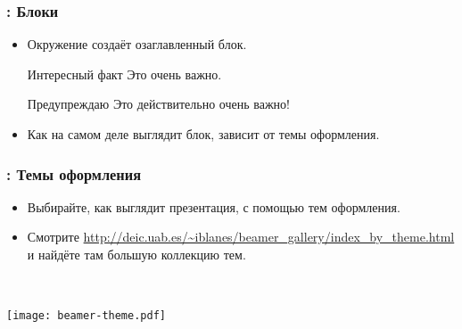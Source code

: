 \documentclass[usenames,dvipsnames]{beamer}
\begin{document}
\begin{frame}[fragile]
\frametitle{\insertsection: Блоки}
\begin{itemize}
\item Окружение  создаёт озаглавленный блок.
\begin{exampletwouptiny}
\begin{block}{Интересный факт}
Это очень важно.
\end{block}

\begin{alertblock}{Предупреждаю}
Это действительно очень важно!
\end{alertblock}
\end{exampletwouptiny}
\item Как на самом деле выглядит блок, зависит от темы оформления.
\end{itemize}
\end{frame}

\begin{frame}[fragile]
\frametitle{\insertsection: Темы оформления}
\vspace{-3ex}
\begin{itemize}
\item Выбирайте, как выглядит презентация, с помощью тем оформления.
\item Смотрите \url{http://deic.uab.es/~iblanes/beamer_gallery/index_by_theme.html}
и найдёте там большую коллекцию тем.
\end{itemize}
\begin{minipage}{0.56\linewidth}
\end{minipage}~~%
\begin{minipage}{0.5\linewidth}
\texttt{[image: beamer-theme.pdf]}
\end{minipage}
\end{frame}
\end{document}
